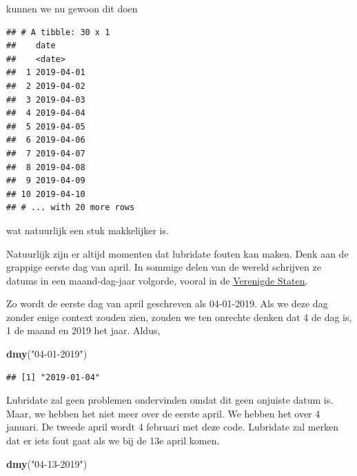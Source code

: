 \documentclass[]{tufte-book}
\newenvironment{Shaded}{}{}
\newcommand{\DataTypeTok}[1]{\textcolor[rgb]{0.56,0.13,0.00}{#1}}
\newcommand{\KeywordTok}[1]{\textcolor[rgb]{0.00,0.44,0.13}{\textbf{#1}}}
\newcommand{\NormalTok}[1]{#1}
\newcommand{\OperatorTok}[1]{\textcolor[rgb]{0.40,0.40,0.40}{#1}}
\newcommand{\StringTok}[1]{\textcolor[rgb]{0.25,0.44,0.63}{#1}}
\begin{document}
kunnen we nu gewoon dit doen

\begin{Shaded}
\end{Shaded}

\begin{verbatim}
## # A tibble: 30 x 1
##    date      
##    <date>    
##  1 2019-04-01
##  2 2019-04-02
##  3 2019-04-03
##  4 2019-04-04
##  5 2019-04-05
##  6 2019-04-06
##  7 2019-04-07
##  8 2019-04-08
##  9 2019-04-09
## 10 2019-04-10
## # ... with 20 more rows
\end{verbatim}

wat natuurlijk een stuk makkelijker is.

Natuurlijk zijn er altijd momenten dat lubridate fouten kan maken. Denk aan de grappige eerste dag van april. In sommige delen van de wereld schrijven ze datums in een maand-dag-jaar volgorde, vooral in de \href{https://en.wikipedia.org/wiki/Date_and_time_notation_in_the_United_States}{Verenigde Staten}.

Zo wordt de eerste dag van april geschreven als 04-01-2019. Als we deze dag zonder enige context zouden zien, zouden we ten onrechte denken dat 4 de dag is, 1 de maand en 2019 het jaar. Aldus,

\begin{Shaded}
\begin{Highlighting}[]
\KeywordTok{dmy}\NormalTok{(}\StringTok{"04-01-2019"}\NormalTok{)}
\end{Highlighting}
\end{Shaded}

\begin{verbatim}
## [1] "2019-01-04"
\end{verbatim}

Lubridate zal geen problemen ondervinden omdat dit geen onjuiste datum is. Maar, we hebben het niet meer over de eerste april. We hebben het over 4 januari. De tweede april wordt 4 februari met deze code. Lubridate zal merken dat er iets fout gaat als we bij de 13e april komen.

\begin{Shaded}
\begin{Highlighting}[]
\KeywordTok{dmy}\NormalTok{(}\StringTok{"04-13-2019"}\NormalTok{)}
\end{Highlighting}
\end{Shaded}
\end{document}

